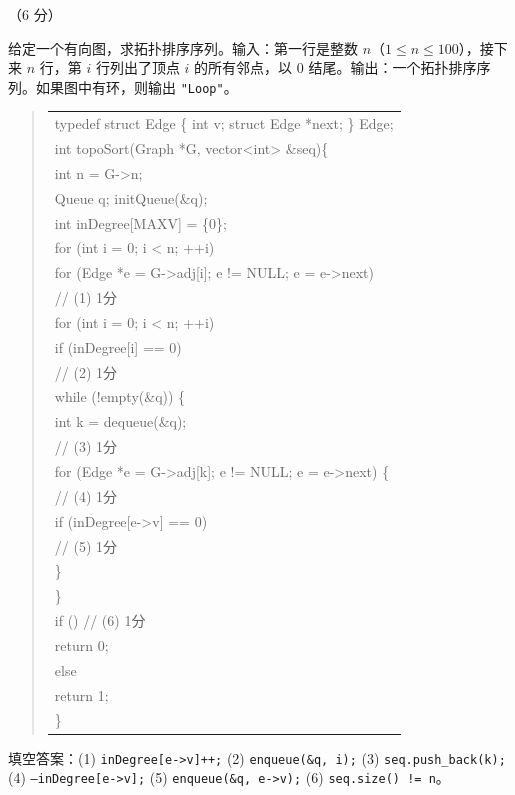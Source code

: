 \begin{question}[拓扑排序]（6 分）

给定一个有向图，求拓扑排序序列。输入：第一行是整数 $n$（$1\le n\le 100$），接下来 $n$ 行，第 $i$ 行列出了顶点 $i$ 的所有邻点，以 $0$ 结尾。输出：一个拓扑排序序列。如果图中有环，则输出 \texttt{"Loop"}。

\begin{quote}
\footnotesize
\begin{tabular}{@{}l@{}}
typedef struct Edge \{ int v; struct Edge *next; \} Edge;\\
int topoSort(Graph *G, vector<int> \&seq)\{\\
    int n = G->n;\\
    Queue q; initQueue(\&q);\\
    int inDegree[MAXV] = \{0\};\\
    for (int i = 0; i < n; ++i)\\
        for (Edge *e = G->adj[i]; e != NULL; e = e->next)\\
\underline{\hspace{12em}} // (1) 1分\\
    for (int i = 0; i < n; ++i)\\
        if (inDegree[i] == 0)\\
\underline{\hspace{12em}} // (2) 1分\\
    while (!empty(\&q)) \{\\
        int k = dequeue(\&q);\\
\underline{\hspace{12em}} // (3) 1分\\
        for (Edge *e = G->adj[k]; e != NULL; e = e->next) \{\\
\underline{\hspace{12em}} // (4) 1分\\
            if (inDegree[e->v] == 0)\\
\underline{\hspace{12em}} // (5) 1分\\
        \}\\
    \}\\
    if (\underline{\hspace{12em}}) // (6) 1分\\
        return 0;\\
    else\\
        return 1;\\
\}\end{tabular}
\end{quote}

\begin{solution}
填空答案：(1) \texttt{inDegree[e->v]++;} (2) \texttt{enqueue(\&q, i);} (3) \texttt{seq.push\_back(k);} (4) \texttt{--inDegree[e->v];} (5) \texttt{enqueue(\&q, e->v);} (6) \texttt{seq.size() != n}。
\end{solution}
\end{question}

